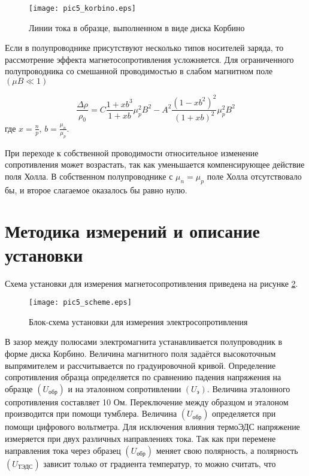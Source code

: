 \begin{figure}[h!]\centering
\texttt{[image: pic5\_korbino.eps]}
\caption{Линии тока в образце, выполненном в виде диска Корбино}
\label{pic5_korbino}
\end{figure}

Если в полупроводнике присутствуют несколько типов носителей заряда, то рассмотрение эффекта магнетосопротивления усложняется. Для ограниченного полупроводника со смешанной проводимостью в слабом магнитном поле $(\mu B \ll 1)$

\begin{equation}
\frac{\Delta \rho}{\rho_{0}} = C \frac{1+ x b^3}{1 + x b} \mu_{p}^{2} B^{2} - A^{2} \frac{(1 - x b^2)^2}{(1 + x b)^2} \mu_{p}^{2} B^{2}
\end{equation}
где $x = \frac{n}{p}$, $b = \frac{\mu_{n}}{\mu_{p}}$.

При переходе к собственной проводимости относительное изменение сопротивления может возрастать, так как уменьшается компенсирующее действие поля Холла. В собственном полупроводнике с $\mu_{n} = \mu_{p}$ поле Холла отсутствовало бы, и второе слагаемое оказалось бы равно нулю.

\section{Методика измерений и описание установки}

Схема установки для измерения магнетосопротивления приведена на рисунке \ref{pic5_scheme}.

\begin{figure}[h!]\centering
\texttt{[image: pic5\_scheme.eps]}
\caption{Блок-схема установки для измерения электросопротивления}
\label{pic5_scheme}
\end{figure}

В зазор между полюсами электромагнита устанавливается полупроводник в форме диска Корбино. Величина магнитного поля задаётся высокоточным выпрямителем и рассчитывается по градуировочной кривой. Определение сопротивления образца определяется по сравнению падения напряжения на образце $(U_{\text{обр}})$ и на эталонном сопротивлении $(U_{\text{э}})$. Величина эталонного сопротивления составляет 10 Ом. Переключение между образцом и эталоном производится при помощи тумблера.
Величина $(U_{\text{обр}})$ определяется при помощи цифрового вольтметра. Для исключения влияния термоЭДС напряжение измеряется при двух различных направлениях тока. Так как при перемене направления тока через образец $(U_{\text{обр}})$ меняет свою полярность, а полярность $(U_{\text{ТЭДС}})$ зависит только от градиента температур, то можно считать, что

